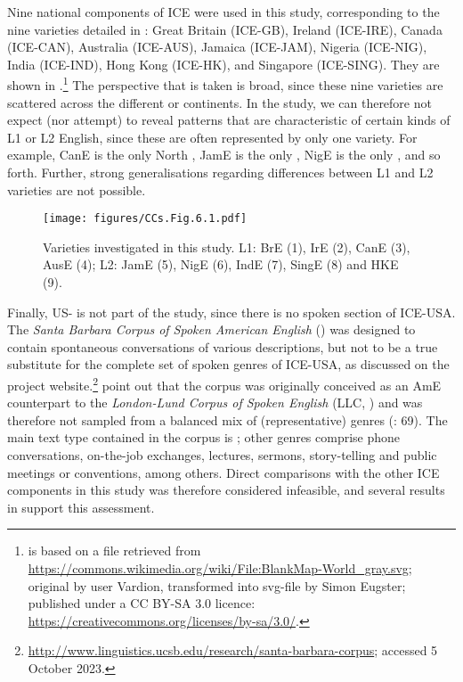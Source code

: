 Nine national components of ICE were used in this study, corresponding to the nine varieties detailed in : Great Britain (ICE-GB), Ireland (ICE-IRE), Canada (ICE-CAN), Australia (ICE-AUS), Jamaica (ICE-JAM), Nigeria (ICE-NIG), India (ICE-IND), Hong Kong (ICE-HK), and Singapore (ICE-SING). They are shown in .\footnote{ is based on a file retrieved from \url{https://commons.wikimedia.org/wiki/File:BlankMap-World_gray.svg}; original by user Vardion, transformed into svg-file by Simon Eugster; published under a CC BY-SA 3.0 licence: \url{https://creativecommons.org/licenses/by-sa/3.0/}.} The perspective that is taken is broad, since these nine varieties are scattered across the different  or continents. In the study, we can therefore not expect (nor attempt) to reveal patterns that are characteristic of certain kinds of L1 or L2 English, since these are often represented by only one variety. For example, CanE is the only North , JamE is the only , NigE is the only , and so forth. Further, strong generalisations regarding differences between L1 and L2 varieties are not possible.

\begin{figure}
\texttt{[image: figures/CCs.Fig.6.1.pdf]}
 \caption{\label{bkm:Ref36942266}\label{fig:6.1}Varieties investigated in this study. L1: BrE (1), IrE (2), CanE (3), AusE (4); L2: JamE (5), NigE (6), IndE (7), SingE (8) and HKE (9).}
\end{figure}

Finally, US- is not part of the study, since there is no spoken section of ICE-USA. The \textit{Santa Barbara Corpus of Spoken American English} (\citealt{DuBoisEtAl2000}) was designed to contain spontaneous conversations of various descriptions, but not to be a true substitute for the complete set of spoken genres of ICE-USA, as discussed on the project website.\footnote{\url{http://www.linguistics.ucsb.edu/research/santa-barbara-corpus}; accessed 5 {October 2023}.} \citet[64–68]{ChafeEtAl1991} point out that the corpus was originally conceived as an AmE counterpart to the \textit{London-Lund Corpus of Spoken English} (LLC, \citealt{SvartvikQuirk1980,GreenbaumSvartvik1990}) and was therefore not sampled from a balanced mix of (representative) genres (\citealt{ChafeEtAl1991}: 69). The main text type contained in the corpus is ; other genres comprise phone conversations, on-the-job exchanges, lectures, sermons, story-telling and public meetings or conventions, among others. Direct comparisons with the other ICE components in this study was therefore considered infeasible, and several results in \citet{Schützler2018c} support this assessment.

